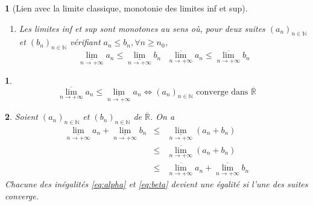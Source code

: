 \documentclass[8pt,notheorems]{beamer}
\def \N{\mathbb N}
\newcommand{\RL}{\mathbb{R}}
\def \limsup{\underset{n\rightarrow+\infty}{\overline{\lim}}}
\def \liminf{\underset{n\rightarrow+\infty}{\underline{\lim}}}
\newtheorem{prop}{\translate{Proposition}}
\newtheorem{remark}{\translate{Remark}}
\theoremstyle{definition}
\theoremstyle{example}
\theoremstyle{mystyle}
\theoremstyle{plain}
\begin{document}
\begin{frame}[allowframebreaks]
\begin{prop}[Lien avec la limite classique, monotonie des limites inf et sup]
\begin{enumerate}
\begin{eqnarray*}
 \underset{n\rightarrow+\infty}{\underline{\lim}}a_n=+\infty&\Leftrightarrow& \underset{n\rightarrow+\infty}{\lim}a_n=+\infty\\
\underset{n\rightarrow+\infty}{\overline{\lim}}a_n=-\infty&\Leftrightarrow&
\underset{n\rightarrow+\infty}{\lim}a_n=-\infty
\end{eqnarray*}
\item Les limites inf et sup sont monotones au sens où, pour deux suites $(a_n)_{n\in\N}$ et $(b_n)_{n\in\N}$ vérifiant $a_n\leq b_n,\forall n\geq n_0$,
$$
\underset{n\rightarrow+\infty}{\underline{\lim}}a_n \leq\underset{n\rightarrow+\infty}{\underline{\lim}}b_n\text{ }\underset{n\rightarrow+\infty}{\overline{\lim}}a_n\leq \underset{n\rightarrow+\infty}{\overline{\lim}}b_n
$$
\end{enumerate}
\end{prop}
\begin{remark}
$$
\underset{n\rightarrow+\infty}{\overline{\lim}}a_n\leq\underset{n\rightarrow+\infty}{\underline{\lim}}a_n\Leftrightarrow (a_n)_{n\in\N}\text{ converge dans }\overline{\RL}
$$
\end{remark}
\begin{prop}\label{prop:Comparaisonlimsupinf}
Soient $(a_n)_{n\in \N}$ et $(b_n)_{n\in \N}$ de $\overline{\RL}$. On a
\begin{eqnarray}
\liminf a_n + \liminf b_n&\leq &\liminf (a_n+b_n)\label{eq:alpha}\\
&\leq& \limsup (a_n+b_n)\nonumber\\
&\leq& \limsup a_n + \limsup b_n \label{eq:beta}
\end{eqnarray}
Chacune des inégalités \eqref{eq:alpha} et \eqref{eq:beta} devient une égalité si l'une des suites converge.
\end{prop}

\end{frame}
\end{document}
